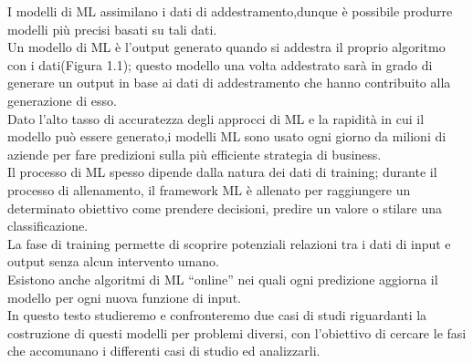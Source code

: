 \documentclass[../tesi.tex]{subfiles}
\begin{document}
I modelli di ML assimilano i dati di addestramento,dunque è possibile produrre modelli più precisi basati su tali dati.\\
Un modello di ML è l’output generato quando si addestra il proprio algoritmo con i dati(Figura 1.1); questo modello una volta addestrato sarà in grado di generare un output in base ai dati di addestramento che hanno contribuito alla generazione di esso.\\
Dato l’alto tasso di accuratezza degli approcci di ML e la rapidità in cui il modello può essere generato,i modelli ML sono usato ogni giorno da milioni di aziende per fare predizioni sulla più efficiente strategia di business.\\
Il processo di ML spesso dipende dalla natura dei dati di training; durante il processo di allenamento, il framework ML è allenato per raggiungere un determinato obiettivo come prendere decisioni, predire un valore o stilare una classificazione.\\
La fase di training permette di scoprire potenziali relazioni tra i dati di input e output senza alcun intervento umano.\\
Esistono anche algoritmi di ML ``online'' nei quali ogni predizione aggiorna il modello per ogni nuova funzione di input.\\
In questo testo studieremo e confronteremo due casi di studi riguardanti la costruzione di questi modelli per problemi diversi, con l’obiettivo di cercare le fasi che accomunano i differenti casi di studio ed analizzarli. 
\end{document}
